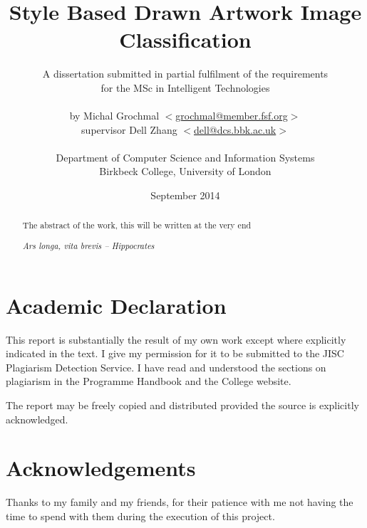 \documentclass[11pt,a4paper,twoside,openright]{report}
\title{Style Based Drawn Artwork Image Classification}
\author{A dissertation submitted in partial fulfilment of the requirements\\
  for the MSc in Intelligent Technologies\\
  \\
  by Michal Grochmal
  $<$\href{mailto:grochmal@member.fsf.org}{grochmal@member.fsf.org}$>$\\
  supervisor Dell Zhang
  $<$\href{mailto:dell@dcs.bbk.ac.uk}{dell@dcs.bbk.ac.uk}$>$\\
  \\
  Department of Computer Science and Information Systems\\
  Birkbeck College, University of London
}
\date{September 2014}
\begin{document}
\VerbatimFootnotes
\maketitle

\newpage
\null
\thispagestyle{empty}
\newpage

\pagestyle{fancy}
\lhead{}
\rhead{}

\begin{abstract}

The abstract of the work, this will be written at the very end

\begin{flushright}
\emph{Ars longa, vita brevis -- Hippocrates}
\end{flushright}
\end{abstract}

\newpage
\null
\thispagestyle{empty}
\newpage

\newpage
{}
{}
\setcounter{page}{1}
\tableofcontents

\newpage
{}
{}
\listoffigures

\newpage
\null
\thispagestyle{empty}
\newpage

\newpage
{}
{}
\listoftables

\newpage
\null
\thispagestyle{empty}
\newpage

\newpage
{}
{}
\chapter*{Academic Declaration}
This report is substantially the result of my own work except where explicitly
indicated in the text.  I give my permission for it to be submitted to the JISC
Plagiarism Detection Service.  I have read and understood the sections on
plagiarism in the Programme Handbook and the College website.

The report may be freely copied and distributed provided the source is
explicitly acknowledged.

\newpage
\null
\thispagestyle{empty}
\newpage

\newpage
{}
{}
\chapter*{Acknowledgements}
Thanks to my family and my friends, for their patience with me not having the
time to spend with them during the execution of this project.
\end{document}
